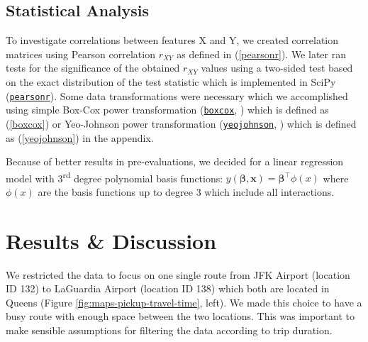\documentclass{article}
\begin{document}
\subsection{Statistical Analysis}
To investigate correlations between features X and Y, we created correlation matrices using Pearson correlation \(r_{XY}\) as defined in (\ref{pearsonr}). We later ran tests for the significance of the obtained \(r_{XY}\) values using a two-sided test based on the exact distribution of the test statistic which is implemented in SciPy \cite{scipy} (\href{https://docs.scipy.org/doc/scipy/reference/generated/scipy.stats.pearsonr.html}{\texttt{pearsonr}}).
Some data transformations were necessary which we accomplished using simple Box-Cox power transformation (\href{https://docs.scipy.org/doc/scipy/reference/generated/scipy.stats.boxcox.html}{\texttt{boxcox}}, \cite{scipy}) which is defined as (\ref{boxcox})
or Yeo-Johnson power transformation (\href{https://docs.scipy.org/doc/scipy/reference/generated/scipy.stats.yeojohnson.html}{\texttt{yeojohnson}}, \cite{scipy}) which is defined as (\ref{yeojohnson}) in the appendix.

Because of better results in pre-evaluations, we decided for a linear regression model with 3\textsuperscript{rd} degree polynomial basis functions: \(y(\bm{\beta}, \textbf{x}) = \bm\beta^\top\phi(x) \) where \(\phi(x)\) are the basis functions up to degree 3 which include all interactions.

\section{Results \& Discussion}
We restricted the data to focus on one single route from JFK Airport (location ID 132) to LaGuardia Airport (location ID 138) which both are located in Queens (Figure \ref{fig:maps-pickup-travel-time}, left). We made this choice to have a busy route with enough space between the two locations. This was important to make sensible assumptions for filtering the data according to trip duration.
\end{document}

